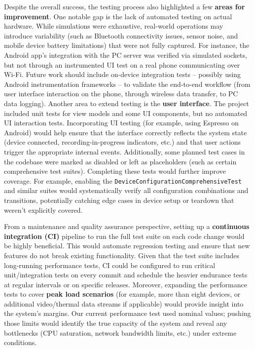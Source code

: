 Despite the overall success, the testing process also highlighted a few \textbf{areas for improvement}. One notable gap is the lack of automated testing on actual hardware. While simulations were exhaustive, real-world operations may introduce variability (such as Bluetooth connectivity issues, sensor noise, and mobile device battery limitations) that were not fully captured. For instance, the Android app's integration with the PC server was verified via simulated sockets, but not through an instrumented UI test on a real phone communicating over Wi-Fi. Future work should include on-device integration tests -- possibly using Android instrumentation frameworks -- to validate the end-to-end workflow (from user interface interaction on the phone, through wireless data transfer, to PC data logging). Another area to extend testing is the \textbf{user interface}. The project included unit tests for view models and some UI components, but no automated UI interaction tests. Incorporating UI testing (for example, using Espresso on Android) would help ensure that the interface correctly reflects the system state (device connected, recording-in-progress indicators, etc.) and that user actions trigger the appropriate internal events. Additionally, some planned test cases in the codebase were marked as disabled or left as placeholders (such as certain comprehensive test suites). Completing these tests would further improve coverage. For example, enabling the \texttt{DeviceConfigurationComprehensiveTest} and similar suites would systematically verify all configuration combinations and transitions, potentially catching edge cases in device setup or teardown that weren't explicitly covered.

From a maintenance and quality assurance perspective, setting up a \textbf{continuous integration (CI)} pipeline to run the full test suite on each code change would be highly beneficial. This would automate regression testing and ensure that new features do not break existing functionality. Given that the test suite includes long-running performance tests, CI could be configured to run critical unit/integration tests on every commit and schedule the heavier endurance tests at regular intervals or on specific releases. Moreover, expanding the performance tests to cover \textbf{peak load scenarios} (for example, more than eight devices, or additional video/thermal data streams if applicable) would provide insight into the system's margins. Our current performance test used nominal values; pushing those limits would identify the true capacity of the system and reveal any bottlenecks (CPU saturation, network bandwidth limits, etc.) under extreme conditions.
